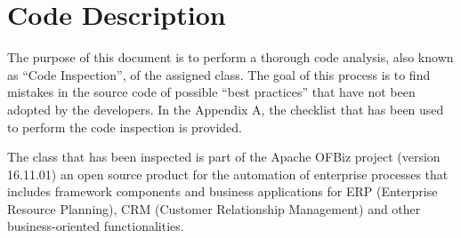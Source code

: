 \chapter{Code Description}
The purpose of this document is to perform a thorough code analysis, also known as \enquote{Code Inspection}, of the assigned class. The goal of this process is to find mistakes in the source code of possible \enquote{best practices} that have not been adopted by the developers. In the Appendix A, the checklist that has been used to perform the code inspection is provided.

The class that has been inspected is part of the Apache OFBiz project (version 16.11.01) an open source product for the automation of enterprise processes that includes framework components and business applications for ERP (Enterprise Resource Planning), CRM (Customer Relationship Management) and other business-oriented functionalities.




